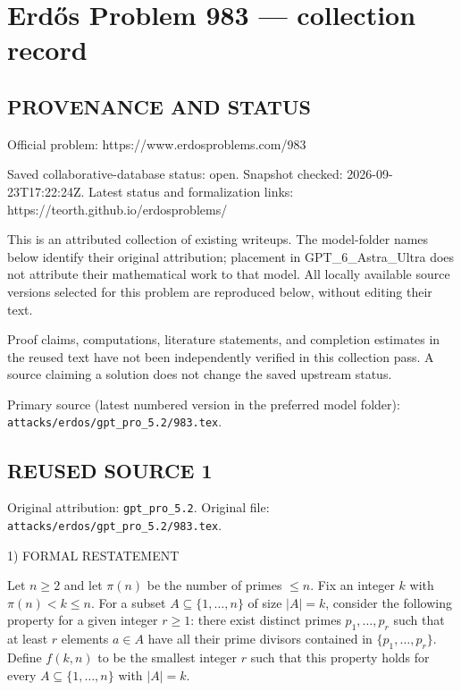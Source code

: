 \section*{Erd\H{o}s Problem 983 --- collection record}

\subsection*{PROVENANCE AND STATUS}
Official problem: https://www.erdosproblems.com/983

Saved collaborative-database status: open.
Snapshot checked: 2026-09-23T17:22:24Z.
Latest status and formalization links: https://teorth.github.io/erdosproblems/

This is an attributed collection of existing writeups. The model-folder names below identify their original attribution; placement in GPT\_6\_Astra\_Ultra does not attribute their mathematical work to that model. All locally available source versions selected for this problem are reproduced below, without editing their text.

Proof claims, computations, literature statements, and completion estimates in the reused text have not been independently verified in this collection pass. A source claiming a solution does not change the saved upstream status.

Primary source (latest numbered version in the preferred model folder): \texttt{attacks/erdos/gpt\_pro\_5.2/983.tex}.

\subsection*{REUSED SOURCE 1}
Original attribution: \texttt{gpt\_pro\_5.2}.
Original file: \texttt{attacks/erdos/gpt\_pro\_5.2/983.tex}.


1) FORMAL RESTATEMENT

Let $n\ge 2$ and let $\pi(n)$ be the number of primes $\le n$. Fix an integer $k$ with $\pi(n)<k\le n$.
For a subset $A\subseteq\{1,\dots,n\}$ of size $|A|=k$, consider the following property for a given integer $r\ge 1$:
there exist distinct primes $p_1,\dots,p_r$ such that at least $r$ elements $a\in A$ have all their prime divisors contained in $\{p_1,\dots,p_r\}$.
Define $f(k,n)$ to be the smallest integer $r$ such that this property holds for every $A\subseteq\{1,\dots,n\}$ with $|A|=k$.

